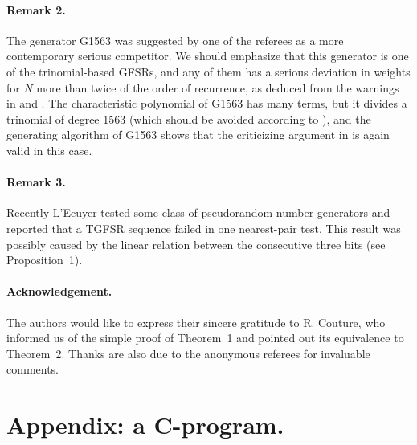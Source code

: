 \paragraph{Remark 2.}
The generator G1563 was suggested by one of the referees as a more contemporary serious competitor.
We should emphasize that this generator is one of the
trinomial-based GFSRs,
and any of them has a serious deviation in weights
for $N$ more than twice of the order of recurrence,
as deduced from the warnings in \cite{lindholm} and \cite{fredricsson}.
The characteristic polynomial of G1563 has many terms,
but it divides a trinomial of degree 1563 (which should be avoided
according to \cite{lindholm}),
and the generating algorithm of G1563
shows that the criticizing argument in \cite{fredricsson} is again
valid in this case.

\paragraph{Remark 3.}
Recently L'Ecuyer\cite{lecuyer}
tested some class of pseudorandom-number generators and reported that 
a TGFSR sequence failed in one nearest-pair test.
This result was possibly caused by
the linear relation between the consecutive three bits
(see Proposition~1).

%

\paragraph{Acknowledgement.}
The authors would like to express their sincere gratitude
to R. Couture, who informed us of the simple proof of Theorem~1
and pointed out its equivalence to Theorem~2.
Thanks are also due to the anonymous referees
for invaluable comments.

\appendix

\section*{Appendix: a C-program.}

